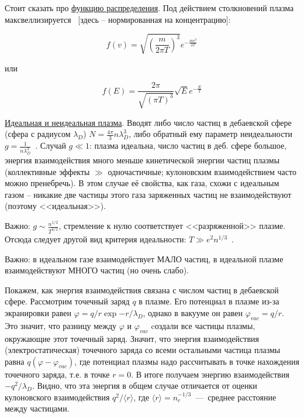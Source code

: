 \documentclass[10pt, a4paper]{article}
\begin{document}
Стоит сказать про \uline{функцию распределения}. Под действием столкновений плазма максвеллизируется~\cite{kroll} [здесь -- нормированная на концентрацию]:

\begin{equation}
	f(v) = \sqrt{\left( \frac{m}{2\pi T}\right)^3} e^{-\frac{mv^2}{2T}}
\end{equation}

или

\begin{equation}
	f(E) = \frac{2\pi}{\sqrt{\left(\pi T\right)^3}}\sqrt{E} e^{-\frac{E}{T}}
\end{equation}

\uline{Идеальная и неидеальная плазма}. Вводят либо число частиц в дебаевской сфере (сфера с радиусом $\lambda_D$) $N = \frac{4\pi}{3}n\lambda_D^3$, либо обратный ему параметр неидеальности $g = \frac{1}{n\lambda_D^3}$~\cite{kroll}. Случай $g \ll 1$: плазма идеальна, число частиц в деб. сфере большое, энергия взаимодействия много меньше кинетической энергии частиц плазмы (коллективные эффекты $\gg$ одночастичные; кулоновским взаимодействием часто можно пренебречь). В этом случае её свойства, как газа, схожи с идеальным газом -- никакие две частицы этого газа заряженных частиц не взаимодействуют (поэтому <<идеальная>>).

Важно: $g \sim \frac{n^{1/2}}{T^{3/2}}$, стремление к нулю соответствует <<разряженной>> плазме. Отсюда следует другой вид критерия идеальности: $T \gg e^2 n^{1/3}$~\cite{kotelnikov}.

Важно: в идеальном газе взаимодействует МАЛО частиц, в идеальной плазме взаимодействуют МНОГО частиц (но очень слабо).

Покажем, как энергия взаимодействия связана с числом частиц в дебаевской сфере. Рассмотрим точечный заряд $q$ в плазме. Его потенциал в плазме из-за экранировки равен $\varphi = q/r\exp{-r/\lambda_D}$, однако в вакууме он равен $\varphi_{vac}=q/r$. Это значит, что разницу между $\varphi$ и $\varphi_{vac}$ cоздали все частицы плазмы, окружающие этот точечный заряд.
Значит, что энергия взаимодействия (электростатическая) точечного заряда со всеми остальными частица плазмы равна $q (\varphi - \varphi_{vac})$, где потенциал плазмы надо рассчитывать в точке нахождения точечного заряда, т.е. в точке $r=0$. В итоге получаем энергию взаимодействия $-q^2/\lambda_D$.
Видно, что эта энергия в общем случае отличается от оценки кулоновского взаимодействия $q^2/\langle r\rangle$, где $\langle r \rangle = n_e^{-1/3}$~---~среднее расстояние между частицами.
\end{document}
